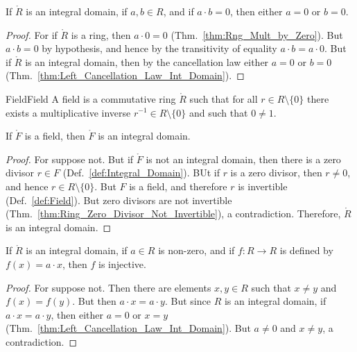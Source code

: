     \begin{theorem}
        \label{thm:Int_Domain_AB_EQ_Zero_A_or_B_EQ_Zero}%
        If $\ring{R}$ is an integral domain, if $a,b\in{R}$, and if
        $a\cdot{b}=0$, then either $a=0$ or $b=0$.
    \end{theorem}
    \begin{proof}
        For if $\ring{R}$ is a ring, then $a\cdot{0}=0$
        (Thm.~\ref{thm:Rng_Mult_by_Zero}). But $a\cdot{b}=0$ by hypothesis,
        and hence by the transitivity of equality $a\cdot{b}=a\cdot{0}$.
        But if $\ring{R}$ is an integral domain, then by the cancellation
        law either $a=0$ or $b=0$
        (Thm.~\ref{thm:Left_Cancellation_Law_Int_Domain}).
    \end{proof}
    \begin{fdefinition}{Field}{Field}
        A field is a commutative ring $\ring{R}$ such that for all
        $r\in{R}\setminus\{0\}$ there exists a multiplicative inverse
        $r^{\minus{1}}\in{R}\setminus\{0\}$ and such that $0\ne{1}$.
    \end{fdefinition}
    \begin{theorem}
        \label{thm:Fields_are_Int_Domains}%
        If $\ring{F}$ is a field, then $\ring{F}$ is an integral domain.
    \end{theorem}
    \begin{proof}
        For suppose not. But if $\ring{F}$ is not an integral domain,
        then there is a zero divisor $r\in{F}$
        (Def.~\ref{def:Integral_Domain}). BUt if $r$ is a zero divisor, then
        $r\ne{0}$, and hence $r\in{R}\setminus\{0\}$. But $F$ is a field,
        and therefore $r$ is invertible (Def.~\ref{def:Field}). But
        zero divisors are not invertible
        (Thm.~\ref{thm:Ring_Zero_Divisor_Not_Invertible}), a contradiction.
        Therefore, $\ring{R}$ is an integral domain.
    \end{proof}
    \begin{theorem}
        \label{thm:Int_Domain_Left_Mult_is_Inj}%
        If $\ring{R}$ is an integral domain, if $a\in{R}$ is non-zero, and
        if $f:R\rightarrow{R}$ is defined by $f(x)=a\cdot{x}$, then $f$
        is injective.
    \end{theorem}
    \begin{proof}
        For suppose not. Then there are elements $x,y\in{R}$ such that
        $x\ne{y}$ and $f(x)=f(y)$. But then $a\cdot{x}=a\cdot{y}$. But since
        $R$ is an integral domain, if $a\cdot{x}=a\cdot{y}$, then either
        $a=0$ or $x=y$ (Thm.~\ref{thm:Left_Cancellation_Law_Int_Domain}).
        But $a\ne{0}$ and $x\ne{y}$, a contradiction.
    \end{proof}

